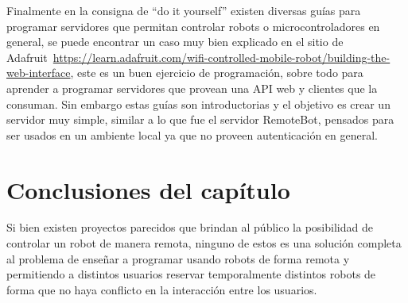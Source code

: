 Finalmente en la consigna de ``do it yourself'' existen diversas guías para
programar servidores que permitan controlar robots o microcontroladores
en general, se puede encontrar un caso muy bien explicado en el sitio
de Adafruit~\url{https://learn.adafruit.com/wifi-controlled-mobile-robot/building-the-web-interface},
este es un buen ejercicio de programación, sobre todo para aprender a
programar servidores que provean una API web y clientes que la consuman. Sin
embargo estas guías son introductorias y el objetivo es crear un servidor
muy simple, similar a lo que fue el servidor RemoteBot, pensados para ser
usados en un ambiente local ya que no proveen autenticación en general.

\section{Conclusiones del capítulo}

Si bien existen proyectos parecidos que brindan al público la posibilidad
de controlar un robot de manera remota, ninguno de estos es una solución
completa al problema de enseñar a programar usando
robots de forma remota y permitiendo a distintos usuarios reservar
temporalmente distintos
robots de forma que no haya conflicto en la interacción entre los usuarios.
